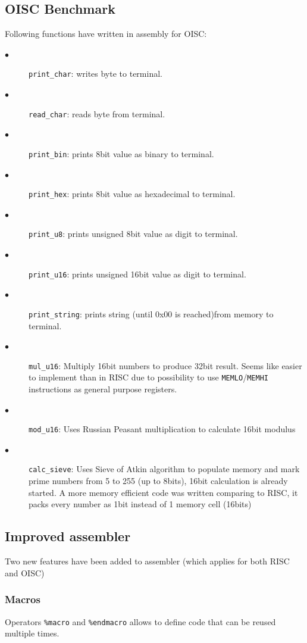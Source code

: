 \documentclass[a4paper,12pt]{article}
\begin{document}
\subsection{OISC Benchmark}
Following functions have written in assembly for OISC:
\begin{description}
	\item[$\bullet$] \texttt{print\_char}: writes byte to terminal.
	\item[$\bullet$] \texttt{read\_char}: reads byte from terminal.
	\item[$\bullet$] \texttt{print\_bin}: prints 8bit value as binary to terminal.
	\item[$\bullet$] \texttt{print\_hex}: prints 8bit value as hexadecimal to terminal.
	\item[$\bullet$] \texttt{print\_u8}: prints unsigned 8bit value as digit to terminal.
	\item[$\bullet$] \texttt{print\_u16}: prints unsigned 16bit value as digit to terminal.	
	\item[$\bullet$] \texttt{print\_string}: prints string (until 0x00 is reached)from memory to terminal.
	\item[$\bullet$] \texttt{mul\_u16}: Multiply 16bit numbers to produce 32bit result. Seems like easier to implement than in RISC due to possibility to use \texttt{MEMLO}/\texttt{MEMHI} instructions as general purpose registers.	
	\item[$\bullet$] \texttt{mod\_u16}: Uses Russian Peasant multiplication to calculate 16bit modulus
	\item[$\bullet$] \texttt{calc\_sieve}: Uses Sieve of Atkin algorithm to populate memory and mark prime numbers from 5 to 255 (up to 8bits), 16bit calculation is already started. A more memory efficient code was written comparing to RISC, it packs every number as 1bit instead of 1 memory cell (16bits)

\end{description}


\subsection{Improved assembler}
Two new features have been added to assembler (which applies for both RISC and OISC)

\subsubsection{Macros}
Operators \texttt{\%macro} and \texttt{\%endmacro} allows to define code that can be reused multiple times.
\end{document}
